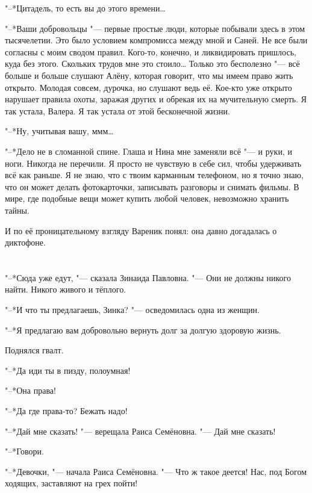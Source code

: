 "--*Цитадель, то есть вы до этого времени\ldots{}

"--*Ваши добровольцы "--- первые простые люди, которые побывали здесь в этом тысячелетии.
Это было условием компромисса между мной и Саней.
Не все были согласны с моим сводом правил.
Кого-то, конечно, и ликвидировать пришлось, куда без этого.
Скольких трудов мне это стоило\ldots{}
Только это бесполезно "--- всё больше и больше слушают Алёну, которая говорит, что мы имеем право жить открыто.
Молодая совсем, дурочка, но слушают ведь её.
Кое-кто уже открыто нарушает правила охоты, заражая других и обрекая их на мучительную смерть.
Я так устала, Валера.
Я так устала от этой бесконечной жизни.

"--*Ну, учитывая вашу, ммм\ldots{}

"--*Дело не в сломанной спине.
Глаша и Нина мне заменяли всё "--- и руки, и ноги.
Никогда не перечили.
Я просто не чувствую в себе сил, чтобы удерживать всё как раньше.
Я не знаю, что с твоим карманным телефоном, но я точно знаю, что он может делать фотокарточки, записывать разговоры и снимать фильмы.
В мире, где подобные вещи может купить любой человек, невозможно хранить тайны.

И по её проницательному взгляду Вареник понял: она давно догадалась о диктофоне.


\chapter{}

\textspace

"--*Сюда уже едут, "--- сказала Зинаида Павловна.
"--- Они не должны никого найти.
Никого живого и тёплого.

"--*И что ты предлагаешь, Зинка? "--- осведомилась одна из женщин.

"--*Я предлагаю вам добровольно вернуть долг за долгую здоровую жизнь.

Поднялся гвалт.

"--*Да иди ты в пизду, полоумная!

"--*Она права!

"--*Да где права-то?
Бежать надо!

"--*Дай мне сказать! "--- верещала Раиса Семёновна.
"--- Дай мне сказать!

"--*Говори.

"--*Девочки, "--- начала Раиса Семёновна.
"--- Что ж такое деется!
Нас, под Богом ходящих, заставляют на грех пойти!

